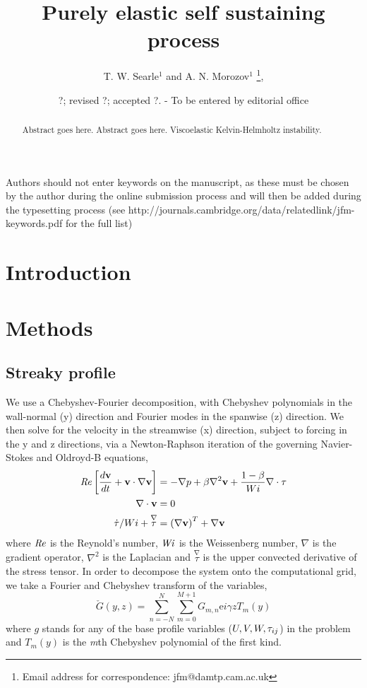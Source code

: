\documentclass{jfm}
\title[Purely elastic self sustaining process]{Purely elastic self sustaining process}
\author[T. W. Searle and A. N. Morozov]%
{T. W. Searle$^1$ and A. N. Morozov$^1$%
  \thanks{Email address for correspondence: jfm@damtp.cam.ac.uk},\ns
}
\affiliation{$^1$SUPA, School of Physics and Astronomy, University of Edinburgh, Mayfield Road,
Edinburgh, EH9 3JZ, UK\\[\affilskip]
}
\date{?; revised ?; accepted ?. - To be entered by editorial office}
\newcommand\Wi{\mbox{\textit{Wi}}}
\newcommand{\dt}[1]{\frac{d #1}{d t}} %
\newcommand{\me}{\mathrm{e}}
\newcommand\Rey{\mbox{\textit{Re}}}  %
\begin{document}
\maketitle

\begin{abstract}
  Abstract goes here. Abstract goes here. Viscoelastic Kelvin-Helmholtz instability. 
\end{abstract}

\begin{keywords}
Authors should not enter keywords on the manuscript, as these must be chosen by the author during the online submission process and will then be added during the typesetting process (see http://journals.cambridge.org/data/\linebreak[3]relatedlink/jfm-\linebreak[3]keywords.pdf for the full list)
\end{keywords}

\section{Introduction}

\section{Methods}

\subsection{Streaky profile}

We use a Chebyshev-Fourier decomposition, with Chebyshev polynomials in the wall-normal (y) direction and Fourier modes in the spanwise (z) direction. We then solve for the velocity in the streamwise (x) direction, subject to forcing in the y and z directions, via a Newton-Raphson iteration of the governing Navier-Stokes and Oldroyd-B equations,
\begin{align}
    \Rey \left[ \dt{\mathbf{v}} + \mathbf{v} \cdot \nabla  \mathbf{v} \right] &= - \nabla p + \beta \nabla^{2} \mathbf{v} + \frac{1-\beta}{Wi} \nabla \cdot \mathbf{\tau} \label{eq:Navier-Stokes}\\
    \nabla \cdot \mathbf{v} &= 0 \label{eq:incompressibility}\\
    \dot{\tau}/Wi + \overset{\nabla}\tau &= \left(\nabla \mathbf{v}\right)^{T} + \nabla{\mathbf{v}}\label{eq:Oldroyd-B}
\end{align}
where $\Rey$ is the Reynold's number, $\Wi$ is the Weissenberg number, $\nabla$ is the gradient operator, $\nabla^{2}$ is the Laplacian and $ \overset{\nabla}\tau$ is the upper convected derivative of the stress tensor. In order to decompose the system onto the computational grid, we take a Fourier and Chebyshev transform of the variables,
\begin{equation}
    \check{G}(y,z) = \sum_{n=-N}^{N} \sum_{m=0}^{M+1} G_{m,n} \me{i\gamma z} T_{m}(y) \label{eq:decomp}
\end{equation}
where $g$ stands for any of the base profile variables ($U,V,W,\boldmath{\tau}_{ij}$) in the problem and $T_{m}(y)$ is the \textit{m}th Chebyshev polynomial of the first kind.
\end{document}
